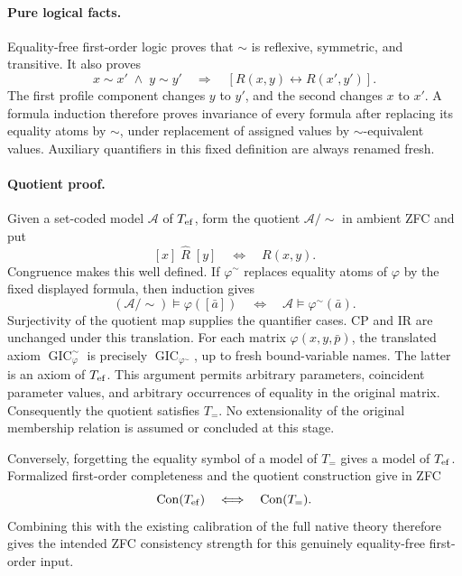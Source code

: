 \paragraph{Pure logical facts.}
Equality-free first-order logic proves that $\sim$ is reflexive, symmetric,
and transitive.  It also proves
\[
 x\sim x'\;\land\;y\sim y'
 \quad\Longrightarrow\quad
 [R(x,y)\leftrightarrow R(x',y')].
\]
The first profile component changes $y$ to $y'$, and the second changes
$x$ to $x'$.  A formula induction therefore proves invariance of every
formula after replacing its equality atoms by $\sim$, under replacement
of assigned values by $\sim$-equivalent values.  Auxiliary quantifiers in
this fixed definition are always renamed fresh.

\paragraph{Quotient proof.}
Given a set-coded model $\mathcal A$ of $T_{\rm ef}$, form the quotient
$\mathcal A/{\sim}$ in ambient ZFC and put
\[
 [x]\;\widehat R\;[y]\quad\Longleftrightarrow\quad R(x,y).
\]
Congruence makes this well defined.  If $\varphi^\sim$ replaces equality
atoms of $\varphi$ by the fixed displayed formula, then induction gives
\[
 (\mathcal A/{\sim})\models\varphi([\bar a])
 \quad\Longleftrightarrow\quad
 \mathcal A\models\varphi^\sim(\bar a).
\]
Surjectivity of the quotient map supplies the quantifier cases.  CP and IR
are unchanged under this translation.  For each matrix $\varphi(x,y,\bar p)$,
the translated axiom $\operatorname{GIC}_{\varphi}^{\sim}$ is precisely
$\operatorname{GIC}_{\varphi^{\sim}}$, up to fresh bound-variable names.
The latter is an axiom of $T_{\rm ef}$.  This argument permits arbitrary
parameters, coincident parameter values, and arbitrary occurrences of
equality in the original matrix.  Consequently the quotient satisfies
$T_{=}$.  No extensionality of the original membership relation is assumed
or concluded at this stage.

Conversely, forgetting the equality symbol of a model of $T_{=}$ gives a
model of $T_{\rm ef}$.  Formalized first-order completeness and the quotient
construction give in ZFC
\[
 \operatorname{Con}(T_{\rm ef})
 \quad\Longleftrightarrow\quad
 \operatorname{Con}(T_{=}).
\]
Combining this with the existing calibration of the full native theory
therefore gives the intended ZFC consistency strength for this genuinely
equality-free first-order input.

